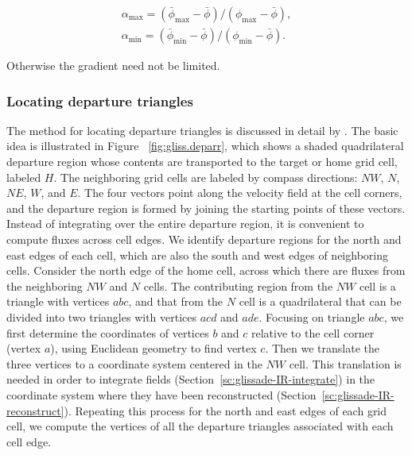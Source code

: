 \begin{equation}
  \label{gliss.eq.IR_limited_gradient}
  \begin{split}
    \alpha_{\max} = (\bar{\phi}_{\max} - \bar{\phi}) / (\phi_{\max} -\bar{\phi}), \\
    \alpha_{\min} = (\bar{\phi}_{\min} - \bar{\phi}) / (\phi_{\min} -\bar{\phi}).
  \end{split}
\end{equation}

\noindent
Otherwise the gradient need not be limited.

\subsubsection{Locating departure triangles}
\label{sc:glissade-IR-departure} 
The method for locating departure triangles is discussed in detail by 
\citet{Dukowicz2000}. The basic idea is illustrated in Figure ~\ref{fig:gliss.deparr}, 
which shows a shaded quadrilateral departure region whose contents are transported to
the target or home grid cell, labeled $H$. The neighboring grid
cells are labeled by compass directions: $NW$, $N$, $NE$, $W$, and
$E$.  The four vectors point along the velocity field at the cell
corners, and the departure region is formed by joining the
starting points of these vectors.  Instead of integrating over the
entire departure region, it is convenient to compute fluxes across
cell edges.  We identify departure regions for the north and east
edges of each cell, which are also the south and west edges of
neighboring cells. Consider the north edge of the home cell,
across which there are fluxes from the neighboring $NW$ and $N$
cells. The contributing region from the $NW$ cell is a triangle
with vertices $abc$, and that from the $N$ cell is a quadrilateral
that can be divided into two triangles with vertices $acd$ and
$ade$. Focusing on triangle $abc$, we first determine the
coordinates of vertices $b$ and $c$ relative to the cell corner
(vertex $a$), using Euclidean geometry to find vertex $c$. Then we
translate the three vertices to a coordinate system centered in
the $NW$ cell.  This translation is needed in order to integrate
fields (Section~\ref{sc:glissade-IR-integrate}) in the coordinate
system where they have been reconstructed
(Section~\ref{sc:glissade-IR-reconstruct}). Repeating this process for
the north and east edges of each grid cell, we compute the
vertices of all the departure triangles associated with each cell
edge.

